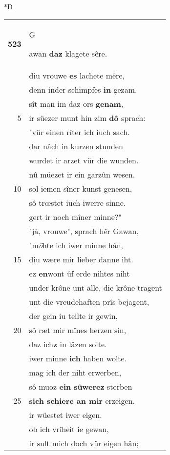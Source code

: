\documentclass[8pt,a4paper,notitlepage]{article}
\begin{document}
\begin{table}[ht]
\begin{minipage}[t]{0.5\linewidth}
\small
\begin{center}*D
\end{center}
\begin{tabular}{rl}
\textbf{523} & \begin{large}G\end{large}awan \textbf{daz} klagete sêre.\\ 
 & diu vrouwe \textbf{es} lachete mêre,\\ 
 & denn inder schimpfes \textbf{in} gezam.\\ 
 & sît man im daz ors \textbf{genam},\\ 
5 & ir süezer munt hin zim \textbf{dô} sprach:\\ 
 & "vür einen rîter ich iuch sach.\\ 
 & dar nâch in kurzen stunden\\ 
 & wurdet ir arzet vür die wunden.\\ 
 & nû müezet ir ein garzûn wesen.\\ 
10 & sol iemen sîner kunst genesen,\\ 
 & sô trœstet iuch iwerre sinne.\\ 
 & gert ir noch mîner minne?"\\ 
 & "jâ, vrouwe", sprach hêr Gawan,\\ 
 & "m\textit{ö}hte ich iwer minne hân,\\ 
15 & diu wære mir lieber danne iht.\\ 
 & ez \textbf{en}wont ûf erde nihtes niht\\ 
 & under krône unt alle, die krône tragent\\ 
 & unt die vreudehaften prîs bejagent,\\ 
 & der gein iu teilte ir gewin,\\ 
20 & sô ræt mir mînes herzen sin,\\ 
 & daz ich\textbf{z} in lâzen solte.\\ 
 & iwer minne \textbf{ich} haben wolte.\\ 
 & mag ich der niht erwerben,\\ 
 & sô muoz \textbf{ein sûwerez} sterben\\ 
25 & \textbf{sich schiere an mir} erzeigen.\\ 
 & ir wüestet iwer eigen.\\ 
 & ob ich vrîheit ie gewan,\\ 
 & ir sult mich doch vür eigen hân;\\ 

\end{tabular}
\end{minipage}
\end{table}
\end{document}
